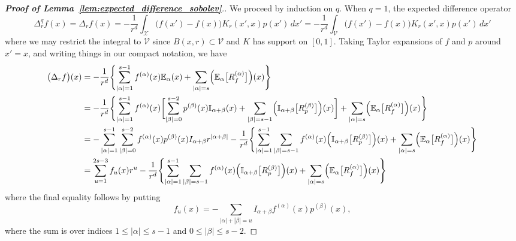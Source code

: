 \documentclass{article}
\newcommand{\abs}[1]{\left \lvert #1 \right \rvert}
\newcommand{\1}{\mathbf{1}}
\newcommand{\Xset}{\mathcal{X}}
\newcommand{\Vset}{\mathcal{V}}
\newcommand{\Ebb}{\mathbb{E}}
\newcommand{\Ibb}{\mathbb{I}}
\theoremstyle{alden}
\theoremstyle{aldenthm}
\theoremstyle{definition}
\theoremstyle{remark}
\begin{document}
\begin{proof}[\textbf{Proof of Lemma~\ref{lem:expected_difference_sobolev}}.]
	We proceed by induction on $q$. When $q = 1$, the expected difference operator
	\begin{equation*}
	\Delta_r^qf(x) = \Delta_rf(x) = -\frac{1}{r^d} \int_{\Xset} \bigl(f(x') - f(x)\bigr) K_r(x',x) p(x') \,dx' =  -\frac{1}{r^d} \int_{\Vset} \bigl(f(x') - f(x)\bigr) K_r(x',x) p(x') \,dx'
	\end{equation*}
	where we may restrict the integral to $\Vset$ since $B(x,r) \subset \Vset$ and $K$ has support on $[0,1]$. Taking Taylor expansions of $f$ and $p$ around $x' = x$, and writing things in our compact notation, we have
	\begin{align}
	\bigl(\Delta_rf\bigr)(x) & = -\frac{1}{r^d} \Biggl\{ \sum_{\abs{\alpha} = 1}^{s - 1} f^{(\alpha)}(x) \Ebb_{\alpha}(x) + \sum_{\abs{\alpha} = s}\Bigl(\Ebb_{\alpha}\bigl[R_f^{(\alpha)}\bigr]\Bigr)(x) \Biggr\}  \nonumber\\
	& = -\frac{1}{r^d} \Biggl\{ \sum_{\abs{\alpha} = 1}^{s - 1} f^{(\alpha)}(x) \biggl[ \sum_{\abs{\beta} = 0}^{s - 2} p^{(\beta)}(x) \Ibb_{\alpha + \beta}(x) + \sum_{\abs{\beta} = s - 1} \Bigl(\Ibb_{\alpha + \beta}\bigl[R_p^{(\beta)}\bigr]\Bigr)(x)  \biggr] + \sum_{\abs{\alpha} = s}\Bigl(\Ebb_{\alpha}\bigl[R_f^{(\alpha)}\bigr]\Bigr)(x) \Biggr\} \nonumber \\
	& = - \sum_{\abs{\alpha} = 1}^{s - 1}  \sum_{\abs{\beta} = 0}^{s - 2}  f^{(\alpha)}(x) p^{(\beta)}(x) I_{\alpha + \beta} r^{\abs{\alpha + \beta}} - \frac{1}{r^d} \Biggl\{\sum_{\abs{\alpha} = 1}^{s - 1} \sum_{\abs{\beta} = s - 1} f^{(\alpha)}(x)\Bigl(\Ibb_{\alpha + \beta}\bigl[R_p^{(\beta)}\bigr]\Bigr)(x)+ \sum_{\abs{\alpha} = s}\Bigl(\Ebb_{\alpha}\bigl[R_f^{(\alpha)}\bigr]\Bigr)(x) \Biggr\} \nonumber \\
	& = \sum_{u = 1}^{2s - 3} f_u(x) r^{u} - \frac{1}{r^d} \Biggl\{\sum_{\abs{\alpha} = 1}^{s - 1} \sum_{\abs{\beta} = s - 1} f^{(\alpha)}(x)\Bigl(\Ibb_{\alpha + \beta}\bigl[R_p^{(\beta)}\bigr]\Bigr)(x)+ \sum_{\abs{\alpha} = s}\Bigl(\Ebb_{\alpha}\bigl[R_f^{(\alpha)}\bigr]\Bigr)(x) \Biggr\} \label{pf:expected_difference_sobolev_1}
	\end{align}
	where the final equality follows by putting
	\begin{equation}
	\label{pf:expected_difference_sobolev}
	f_u(x) = - \sum_{\abs{\alpha} + \abs{\beta} = u} I_{\alpha + \beta} f^{(\alpha)}(x) p^{(\beta)}(x),
	\end{equation}
    where the sum is over indices $1 \leq \abs{\alpha} \leq s - 1$ and $0 \leq \abs{\beta} \leq s - 2$. 
    

\end{proof}
\end{document}
